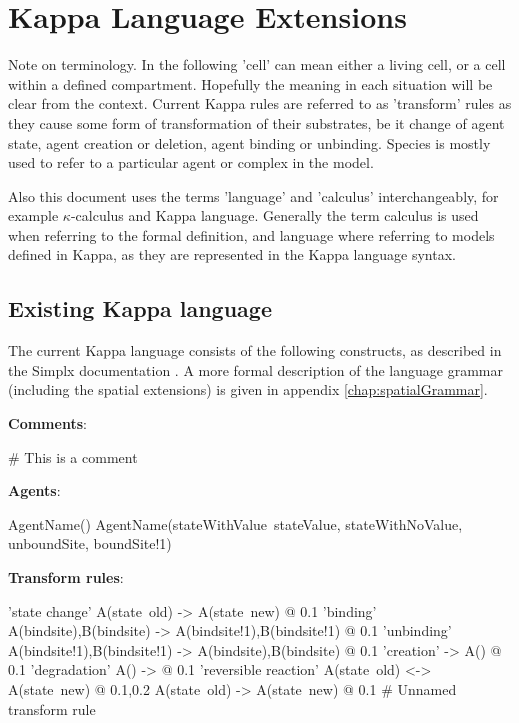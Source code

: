 \chapter{Kappa Language Extensions}

Note on terminology. In the following 'cell' can mean either a living cell, or a cell within a defined compartment. Hopefully the meaning in each situation will be clear from the context. Current Kappa rules are referred to as 'transform' rules as they cause some form of transformation of their substrates, be it change of agent state, agent creation or deletion, agent binding or unbinding. Species is mostly used to refer to a particular agent or complex in the model.

Also this document uses the terms 'language' and 'calculus' interchangeably, for example $\kappa$-calculus and Kappa language. Generally the term calculus is used when referring to the formal definition, and language where referring to models defined in Kappa, as they are represented in the Kappa language syntax.

\section{Existing Kappa language}

The current Kappa language consists of the following constructs, as described in the Simplx documentation \citep{krivine2009}. A more formal description of the language grammar (including the spatial extensions) is given in appendix \ref{chap:spatialGrammar}.

\textbf{Comments}:

\begin{kappasource}
# This is a comment
\end{kappasource} 

\textbf{Agents}:

\begin{kappasource}
AgentName()
AgentName(stateWithValue~stateValue, stateWithNoValue, unboundSite, boundSite!1)
\end{kappasource} 


\textbf{Transform rules}:

\begin{kappasource}
'state change' A(state~old) -> A(state~new) @ 0.1
'binding'      A(bindsite),B(bindsite) -> A(bindsite!1),B(bindsite!1) @ 0.1
'unbinding'    A(bindsite!1),B(bindsite!1) -> A(bindsite),B(bindsite) @ 0.1
'creation'     -> A() @ 0.1
'degradation'  A() -> @ 0.1
'reversible reaction'  A(state~old) <-> A(state~new) @ 0.1,0.2
A(state~old) -> A(state~new) @ 0.1 # Unnamed transform rule
\end{kappasource} 

